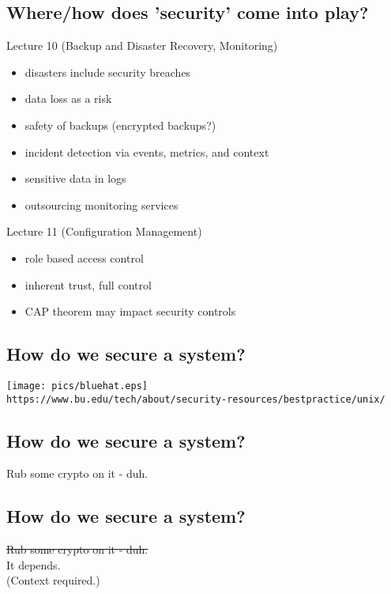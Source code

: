 \documentclass[xga]{xdvislides}
\begin{document}
\subsection{Where/how does 'security' come into play?}
Lecture 10 (Backup and Disaster Recovery, Monitoring)
\begin{itemize}
	\item disasters include security breaches
	\item data loss as a risk
	\item safety of backups (encrypted backups?)
	\item incident detection via events, metrics, and context
	\item sensitive data in logs
	\item outsourcing monitoring services
\end{itemize}
\vspace{.2in}
Lecture 11 (Configuration Management)
\begin{itemize}
	\item role based access control
	\item inherent trust, full control
	\item CAP theorem may impact security controls
\end{itemize}

\subsection{How do we secure a system?}
\vspace*{\fill}
\begin{center}
	\texttt{[image: pics/bluehat.eps]} \\
	\vspace{.25in}
	\verb+https://www.bu.edu/tech/about/security-resources/bestpractice/unix/+
\end{center}
\vspace*{\fill}

\subsection{How do we secure a system?}
\Huge
\vspace*{\fill}
\begin{center}
	Rub some crypto on it - duh. \\
\end{center}
\vspace*{\fill}

\subsection{How do we secure a system?}
\Huge
\vspace*{\fill}
\begin{center}
	\sout{Rub some crypto on it - duh.} \\
\vspace{.5in}
	It depends. \\
\vspace{.5in}
\Normalsize
	(Context required.)
\end{center}
\vspace*{\fill}
\end{document}
